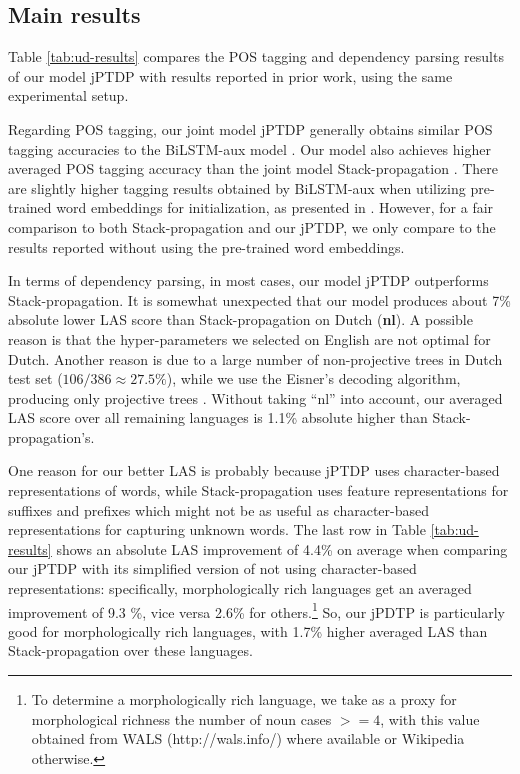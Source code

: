 \documentclass[11pt,letterpaper]{article}
\begin{document}
\subsection{Main results}

Table \ref{tab:ud-results} compares the POS tagging and dependency parsing results of our model jPTDP with  results reported in prior work,  using the same experimental setup.

Regarding POS tagging,  our joint model jPTDP generally obtains similar POS tagging accuracies  to the   BiLSTM-aux  model \citep{plankP16}. Our model also achieves higher averaged POS tagging accuracy  than the  joint   model Stack-propagation \citep{zhang-weiss:2016:P16-1}. There are slightly higher tagging results obtained by  BiLSTM-aux  when utilizing pre-trained word embeddings for initialization, as presented in \citet{plankP16}. However, for a fair comparison to both Stack-propagation and our jPTDP, we only compare to  the results reported without using the pre-trained word embeddings. 

In terms of dependency parsing, in most cases, our  model jPTDP  outperforms Stack-propagation. It is somewhat unexpected that our  model produces about 7\% absolute lower LAS score than Stack-propagation on Dutch (\textbf{nl}). 
A possible reason is
that the hyper-parameters we selected on English
are not optimal for Dutch. Another reason is due to a large number of non-projective  trees in Dutch test set ($106 / 386 \approx 27.5 \%$), while we use the Eisner's decoding algorithm, producing only  projective trees \citep{Eisner:1996}. Without taking ``nl'' into account, our averaged LAS score over all remaining languages is 1.1\% absolute higher than Stack-propagation's. 


One reason for our better LAS is probably because jPTDP uses character-based representations of words, while Stack-propagation uses feature representations for suffixes and prefixes which might not be as useful as character-based representations for capturing unknown words. The last row in  Table \ref{tab:ud-results} shows an absolute LAS improvement of 4.4\% on average  when comparing our jPTDP with its simplified version of not  using character-based representations: specifically, morphologically rich languages get an averaged improvement of 9.3 \%,  vice versa 2.6\% for others.\footnote{To determine a morphologically rich language, we take as a proxy for morphological richness the number of noun cases $>= 4$, with this value obtained from WALS (http://wals.info/) where
available  or Wikipedia otherwise.} 
So, our jPDTP is particularly good for morphologically rich languages, with  1.7\% higher averaged LAS than Stack-propagation over these languages.
\end{document}
